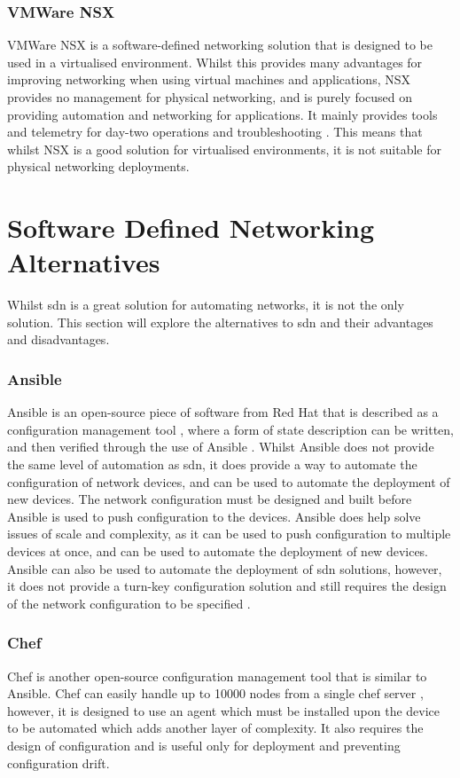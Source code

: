 \subsubsection{VMWare NSX}
VMWare NSX is a software-defined
networking solution that is designed to be used in a virtualised environment.
Whilst this provides many advantages for improving networking when using
virtual machines and applications, NSX provides no management for physical
networking, and is purely focused on providing automation and networking for
applications. It mainly provides tools and telemetry for day-two operations and
troubleshooting \citep{2}. This means that whilst NSX is a good solution for
virtualised environments, it is not suitable for physical networking
deployments.

\section{Software Defined Networking Alternatives}
\label{litreview:alternatives}
Whilst \gls{sdn} is a great
solution for
automating networks, it is not the only solution. This section
will explore the
alternatives to \gls{sdn} and their advantages and
disadvantages.
\subsubsection{Ansible}
Ansible is an open-source piece of software from Red
Hat that is described as a configuration management tool \citep{4}, where a form of state
description can be written, and then verified through the use of Ansible
\citep{powerofansible}. Whilst Ansible does not provide the same level of
automation as \gls{sdn}, it does provide a way to automate the configuration of
network devices, and can be used to automate the deployment of new devices. The
network configuration must be designed and built before Ansible is used to push
configuration to the devices. Ansible does help solve issues of scale and
complexity, as it can be used to push configuration to multiple devices at
once, and can be used to automate the deployment of new devices. Ansible can also be used to automate the deployment of \gls{sdn} solutions, however, it does not provide a turn-key configuration solution and still requires the design of the network configuration to be specified \citep{multi-domain}.

\subsubsection{Chef}
Chef is another open-source configuration management tool
that is similar to Ansible. Chef can easily handle up to 10000 nodes from a
single chef server \citep{sabharwal2014automation}, however, it is designed to
use an agent which must be installed upon the device to be automated which adds
another layer of complexity. It also requires the design of configuration and
is useful only for deployment and preventing configuration drift.

